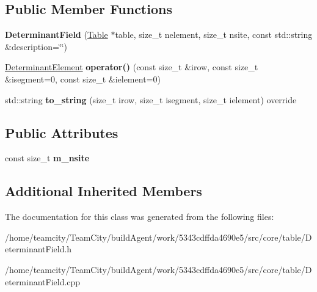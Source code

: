 \subsection*{Public Member Functions}
\begin{DoxyCompactItemize}
\item 
{\bfseries Determinant\+Field} (\hyperlink{classTable}{Table} $\ast$table, size\+\_\+t nelement, size\+\_\+t nsite, const std\+::string \&description=\char`\"{}\char`\"{})\hypertarget{classDeterminantField_a4a78bd11b89a0791bea26e583e1771b4}{}\label{classDeterminantField_a4a78bd11b89a0791bea26e583e1771b4}

\item 
\hyperlink{classDeterminantElement}{Determinant\+Element} {\bfseries operator()} (const size\+\_\+t \&irow, const size\+\_\+t \&isegment=0, const size\+\_\+t \&ielement=0)\hypertarget{classDeterminantField_ae40d526423cefc0be2ba2f39b1ccd3db}{}\label{classDeterminantField_ae40d526423cefc0be2ba2f39b1ccd3db}

\item 
std\+::string {\bfseries to\+\_\+string} (size\+\_\+t irow, size\+\_\+t isegment, size\+\_\+t ielement) override\hypertarget{classDeterminantField_a6a3a2a1523d6f7a1d49e533be4298739}{}\label{classDeterminantField_a6a3a2a1523d6f7a1d49e533be4298739}

\end{DoxyCompactItemize}
\subsection*{Public Attributes}
\begin{DoxyCompactItemize}
\item 
const size\+\_\+t {\bfseries m\+\_\+nsite}\hypertarget{classDeterminantField_a8892acc9446867cf8a21f24ec4ce6b88}{}\label{classDeterminantField_a8892acc9446867cf8a21f24ec4ce6b88}

\end{DoxyCompactItemize}
\subsection*{Additional Inherited Members}


The documentation for this class was generated from the following files\+:\begin{DoxyCompactItemize}
\item 
/home/teamcity/\+Team\+City/build\+Agent/work/5343cdffda4690e5/src/core/table/Determinant\+Field.\+h\item 
/home/teamcity/\+Team\+City/build\+Agent/work/5343cdffda4690e5/src/core/table/Determinant\+Field.\+cpp\end{DoxyCompactItemize}
